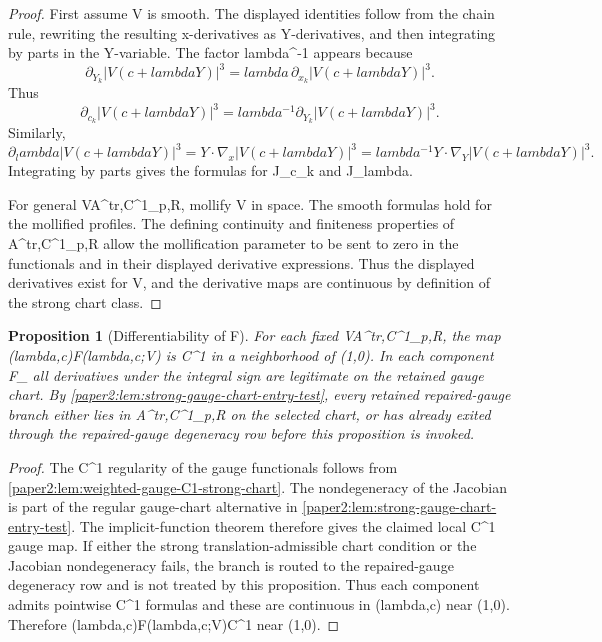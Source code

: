 \documentclass[11pt]{amsart}
\def\({}%
\def\){}%
\def\lambda{lambda}%
\theoremstyle{plain}
\newtheorem{proposition}[proposition]{Proposition}
\theoremstyle{definition}
\theoremstyle{remark}
\begin{document}
\begin{proof}
First assume \(V\) is smooth.  The displayed identities follow from the chain
rule, rewriting the resulting \(x\)-derivatives as \(Y\)-derivatives, and then
integrating by parts in the \(Y\)-variable.  The
factor \(\lambda^{-1}\) appears because
\[
   \partial_{Y_k}|V(c+\lambda Y)|^3
   =
   \lambda\,\partial_{x_k}|V(c+\lambda Y)|^3 .
\]
Thus
\[
   \partial_{c_k}|V(c+\lambda Y)|^3
   =
   \lambda^{-1}\partial_{Y_k}|V(c+\lambda Y)|^3 .
\]
Similarly,
\[
   \partial_\lambda |V(c+\lambda Y)|^3
   =
   Y\cdot\nabla_x |V(c+\lambda Y)|^3
   =
   \lambda^{-1}Y\cdot\nabla_Y |V(c+\lambda Y)|^3 .
\]
Integrating by parts gives the formulas for
\(\mathcal J_{c_k}\) and \(\mathcal J_\lambda\).

For general \(V\in\mathcal A^{\rm tr,C^1}_{p,R}\), mollify \(V\) in space.
The smooth formulas hold for the mollified profiles.  The defining continuity
and finiteness properties of \(\mathcal A^{\rm tr,C^1}_{p,R}\) allow the
mollification parameter to be sent to zero in the functionals and in their
displayed derivative expressions.  Thus the displayed derivatives exist for
\(V\), and the derivative maps are continuous by definition of the strong chart
class.
\end{proof}

\begin{proposition}[Differentiability of \(\mathcal F\)]\label{paper2:prop:gauge-C1}
For each fixed \(V\in\mathcal A^{\rm tr,C^1}_{p,R}\), the map
\((\lambda,c)\mapsto \mathcal F(\lambda,c;V)\) is \(C^1\) in a neighborhood of
\((1,0)\). In each component \( \mathcal F_\alpha\) all derivatives under the
integral sign are legitimate on the retained gauge chart.  By
\cref{paper2:lem:strong-gauge-chart-entry-test}, every retained
repaired-gauge branch either lies in \(\mathcal A^{\rm tr,C^1}_{p,R}\) on the
selected chart, or has already exited through the repaired-gauge degeneracy
row before this proposition is invoked.
\end{proposition}

\begin{proof}
The \(C^1\) regularity of the gauge functionals follows from
\cref{paper2:lem:weighted-gauge-C1-strong-chart}.  The nondegeneracy of the
Jacobian is part of the regular gauge-chart alternative in
\cref{paper2:lem:strong-gauge-chart-entry-test}.  The implicit-function theorem
therefore gives the claimed local \(C^1\) gauge map.  If either the strong
translation-admissible chart condition or the Jacobian nondegeneracy fails, the
branch is routed to the repaired-gauge degeneracy row and is not treated by
this proposition.
Thus each component admits pointwise \(C^1\) formulas and these are continuous in
\((\lambda,c)\) near \((1,0)\). Therefore \((\lambda,c)\mapsto\mathcal F(\lambda,c;V)\in C^1\)
near \((1,0)\).
\end{proof}
\end{document}
